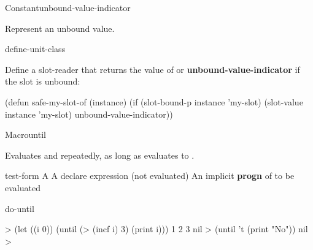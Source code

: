 \documentclass[10pt,twoside,english,pdftex]{article}
\begin{document}
\begin{functiondoc}{Constant}{unbound-value-indicator}{}%

\fnsyntax

\fnpurpose Represent an unbound value.

\fnpackage {}

\fnmodule {}

\begin{alsos}{define-unit-class}
\end{alsos}

\fnexample
Define a slot-reader  that returns the value of  or 
\textbf{unbound-value-indicator} if the slot is unbound: 
%
\W\supp
\begin{example}
  (defun safe-my-slot-of (instance)
    (if (slot-bound-p instance 'my-slot)
        (slot-value instance 'my-slot)
        unbound-value-indicator))
\end{example}

\end{functiondoc}


\begin{functiondoc}{Macro}{until}{ 
    \superstar{}
    \superstar}
%
  
\fnsyntax

\fnpurpose Evaluates  and  repeatedly,
as long as  evaluates to \nil.

\fnpackage {}

\fnmodule {}

\fnargs
\begin{args}{test-form}
 A 
\arg[declaration] A declare expression (not evaluated)
\arg[forms] An implicit \textbf{progn} of  to be evaluated
\end{args}

\begin{alsos}{do-until}
\also[do-until]
\also[while]
\end{alsos}

\fnexamples
%
\W\supp
\begin{example}
  > (let ((i 0)) 
      (until (> (incf i) 3) 
         (print i)))
  1 
  2 
  3 
  nil\goodpagebreak
  > (until 't (print "No"))
  nil
  >
\end{example}

\end{functiondoc}
\end{document}
